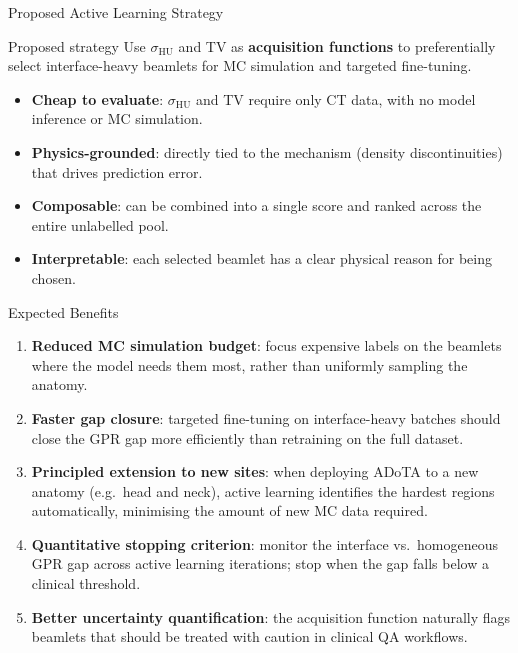 \documentclass[aspectratio=169, 10pt]{beamer}
\begin{document}
\begin{frame}{Proposed Active Learning Strategy}
  \begin{block}{Proposed strategy}
    Use $\sigma_{\text{HU}}$ and TV as \textbf{acquisition
    functions} to preferentially select interface-heavy beamlets
    for MC simulation and targeted fine-tuning.
  \end{block}

  \vspace{6pt}
  \begin{itemize}\setlength{\itemsep}{4pt}
    \item \textbf{Cheap to evaluate}: $\sigma_{\text{HU}}$ and TV
          require only CT data, with no model inference or MC simulation.
    \item \textbf{Physics-grounded}: directly tied to the mechanism
          (density discontinuities) that drives prediction error.
    \item \textbf{Composable}: can be combined into a single score
          and ranked across the entire unlabelled pool.
    \item \textbf{Interpretable}: each selected beamlet has a clear
          physical reason for being chosen.
  \end{itemize}
\end{frame}

\begin{frame}{Expected Benefits}
  \begin{enumerate}\setlength{\itemsep}{6pt}
    \item \textbf{Reduced MC simulation budget}: focus expensive
          labels on the beamlets where the model needs them most,
          rather than uniformly sampling the anatomy.

    \item \textbf{Faster gap closure}: targeted fine-tuning on
          interface-heavy batches should close the GPR gap more
          efficiently than retraining on the full dataset.

    \item \textbf{Principled extension to new sites}: when deploying
          ADoTA to a new anatomy (e.g.\ head and neck), active
          learning identifies the hardest regions automatically,
          minimising the amount of new MC data required.

    \item \textbf{Quantitative stopping criterion}: monitor the
          interface vs.\ homogeneous GPR gap across active learning
          iterations; stop when the gap falls below a clinical
          threshold.

    \item \textbf{Better uncertainty quantification}: the acquisition
          function naturally flags beamlets that should be treated with
          caution in clinical QA workflows.
  \end{enumerate}
\end{frame}
\end{document}

